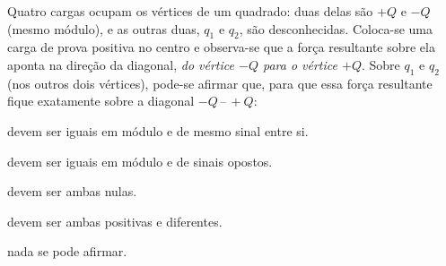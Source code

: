 \begin{questao}[3]{}
Quatro cargas ocupam os vértices de um quadrado: duas delas são $+Q$ e $-Q$ (mesmo
módulo), e as outras duas, $q_1$ e $q_2$, são desconhecidas. Coloca-se uma carga
de prova positiva no centro e observa-se que a força resultante sobre ela aponta
na direção da diagonal, \emph{do vértice $-Q$ para o vértice $+Q$}. Sobre $q_1$ e
$q_2$ (nos outros dois vértices), pode-se afirmar que, para que essa força
resultante fique exatamente sobre a diagonal $-Q\,$--$\,+Q$:
\begin{alternativas}
\item devem ser iguais em módulo e de mesmo sinal entre si.
\item devem ser iguais em módulo e de sinais opostos.
\item devem ser ambas nulas.
\item devem ser ambas positivas e diferentes.
\item nada se pode afirmar.
\end{alternativas}
\end{questao}

